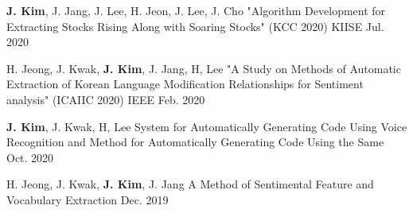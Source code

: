 
\cvsubsection{\textcolor{red}{\\Conference}}

\begin{cventries}

    
    \cventry
    {\textbf{J. Kim}, J. Jang,  J. Lee, H. Jeon, J. Lee, J. Cho
} %
    {"Algorithm Development for Extracting Stocks Rising Along with Soaring Stocks" (KCC 2020)} 
    {KIISE} %
    {Jul. 2020} %
    {
      \begin{cvitems} %
         {}
      \end{cvitems}
    }
    
    \cventry
    {H. Jeong, J. Kwak, \textbf{J. Kim}, J. Jang, H, Lee
} %
    {"A Study on Methods of Automatic Extraction of Korean Language Modification Relationships for Sentiment analysis" (ICAIIC 2020)} %
    {IEEE} %
    {Feb. 2020} %
    {
      \begin{cvitems} 
         {}
      \end{cvitems}
    }
   
\end{cventries}

\cvsubsection{\textcolor{red}{Patent Applications}}

\begin{cventries}


  \cventry
    { \textbf{J. Kim}, J. Kwak, H, Lee
} %
    {System for Automatically Generating Code Using Voice Recognition and Method for Automatically Generating Code Using the Same} %
    {} %
    {Oct. 2020} %
    {
      \begin{cvitems} %
        {}
      \end{cvitems}
    }
    
    \cventry
    { H. Jeong,  J. Kwak, \textbf{J. Kim}, J. Jang
} %
    {A Method of Sentimental Feature and Vocabulary Extraction} %
    {} %
    {Dec. 2019} %
    {
      \begin{cvitems} %
        {}
      \end{cvitems}
    }
    
   

\end{cventries}
